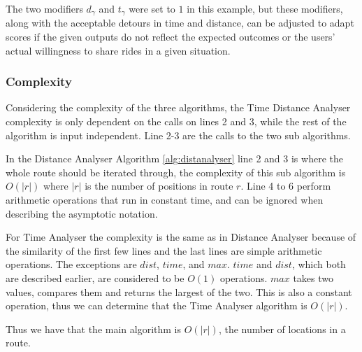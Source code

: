 The two modifiers $d_\gamma$ and $t_\gamma$ were set to $1$ in this example, but these modifiers, along with the acceptable detours in time and distance, can be adjusted to adapt scores if the given outputs do not reflect the expected outcomes or the users' actual willingness to share rides in a given situation. 

\subsubsection{Complexity}
Considering the complexity of the three algorithms, the Time Distance Analyser complexity is only dependent on the calls on lines 2 and 3, while the rest of the algorithm is input independent.
Line 2-3 are the calls to the two sub algorithms.

In the Distance Analyser Algorithm \ref{alg:distanalyser} line 2 and 3 is where the whole route should be iterated through, the complexity of this sub algorithm is $O(|r|)$ where $|r|$ is the number of positions in route $r$.
Line 4 to 6 perform arithmetic operations that run in constant time, and can be ignored when describing the asymptotic notation.

For Time Analyser the complexity is the same as in Distance Analyser because of the similarity of the first few lines and the last lines are simple arithmetic operations. 
The exceptions are $dist$, $time$, and $max$. 
$time$ and $dist$, which both are described earlier, are considered to be $O(1)$ operations.
$max$ takes two values, compares them and returns the largest of the two.
This is also a constant operation, thus we can determine that the Time Analyser algorithm is $O(|r|)$.

Thus we have that the main algorithm is $O(|r|)$, the number of locations in a route.